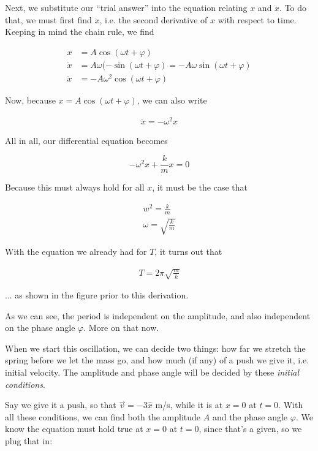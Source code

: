Next, we substitute our ``trial answer'' into the equation relating $x$ and $\ddot{x}$. To do that, we must first find $\ddot{x}$, i.e. the second derivative of $x$ with respect to time. Keeping in mind the chain rule, we find

\begin{align}
x        &= A \cos(\omega t + \varphi)\\
\dot{x}  &= A \omega (-\sin(\omega t + \varphi) = -A \omega \sin(\omega t + \varphi)\\
\ddot{x} &= -A \omega^2 \cos(\omega t + \varphi)
\end{align}

Now, because $x = A \cos(\omega t + \varphi)$, we can also write

\begin{align}
\ddot{x} = -\omega^2 x
\end{align}

All in all, our differential equation becomes

\begin{equation}
- \omega^2 x + \frac{k}{m} x = 0
\end{equation}

Because this must always hold for all $x$, it must be the case that

\begin{align}
w^2 = \frac{k}{m}\\
\omega = \sqrt{\frac{k}{m}}
\end{align}

With the equation we already had for $T$, it turns out that

\begin{align}
T = 2 \pi \sqrt{\frac{m}{k}}
\end{align}

... as shown in the figure prior to this derivation.

As we can see, the period is independent on the amplitude, and also independent on the phase angle $\varphi$. More on that now.

When we start this oscillation, we can decide two things: how far we stretch the spring before we let the mass go, and how much (if any) of a push we give it, i.e. initial velocity. The amplitude and phase angle will be decided by these \emph{initial conditions}.

Say we give it a push, so that $\vec{v} = -3\hat{x}$ m/s, while it is at $x = 0$ at $t = 0$. With all these conditions, we can find both the amplitude $A$ and the phase angle $\varphi$. We know the equation must hold true at $x = 0$ at $t = 0$, since that's a given, so we plug that in:


